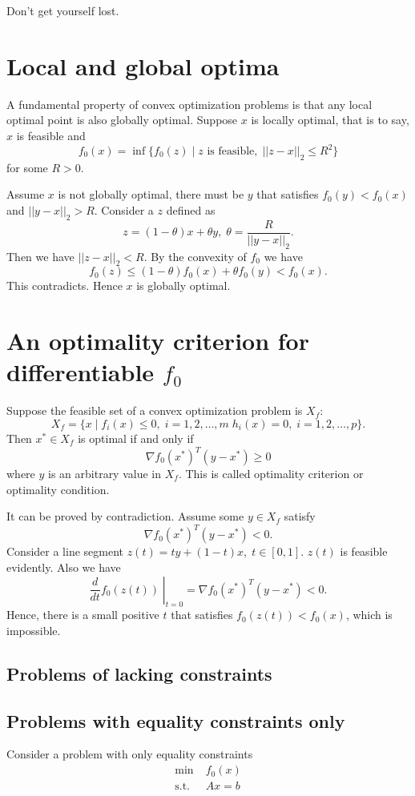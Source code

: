 \documentclass[lang=en,color=blue,mode=fancy,titlestyle=hang]{elegantbook}
\begin{document}
Don't get yourself lost.

\section{Local and global optima}
A fundamental property of convex optimization problems is that any local optimal point is
also globally optimal. Suppose $x$ is locally optimal, that is to say, $x$ is feasible and
\[
f_0(x) = \inf \{ f_0(z) \;|\; z \text{ is feasible}, \; ||z - x||_2 \leq R^2 \}
\]
for some $R > 0$.

Assume $x$ is not globally optimal, there must be $y$ that satisfies $f_0(y) < f_0(x)$ and
$||y - x||_2 > R$. Consider a $z$ defined as
\[
z = (1 - \theta) x + \theta y, \; \theta = \frac{R}{||y - x||_2}.
\]
Then we have $||z - x||_2 < R$. By the convexity of $f_0$ we have
\[
f_0(z) \leq (1 - \theta) f_0(x) + \theta f_0(y) < f_0(x).
\]
This contradicts. Hence $x$ is globally optimal.

\section{An optimality criterion for differentiable $f_0$}

Suppose the feasible set of a convex optimization problem is $X_f$:
\[
X_f = \{ x \;|\; f_i(x) \leq 0, \; i = 1, 2, \ldots, m \; h_i(x) = 0, \; i = 1, 2, \ldots, p \}.
\]
Then $x^* \in X_f$ is optimal if and only if
\[
\nabla f_0(x^*)^T (y - x^*) \geq 0
\]
where $y$ is an arbitrary value in $X_f$. This is called optimality criterion or optimality
condition.

It can be proved by contradiction. Assume some $y \in X_f$ satisfy
\[
{\nabla f_0(x^*)}^T (y - x^*) < 0.
\]
Consider a line segment $z(t) = ty + (1-t)x, \; t \in [0, 1]$. $z(t)$ is feasible evidently.
Also we have
\[
\left. \frac{d}{dt} f_0(z(t)) \; \right|_{t = 0} = {\nabla f_0(x^*)}^T (y - x^*) < 0.
\]
Hence, there is a small positive $t$ that satisfies $f_0(z(t)) < f_0(x)$, which is
impossible.

\subsection{Problems of lacking constraints}
\subsection{Problems with equality constraints only}

Consider a problem with only equality constraints
\begin{align*}
  \min \; &f_0(x) \\
  \text{s.t.} \; &A x = b
\end{align*}
\end{document}
